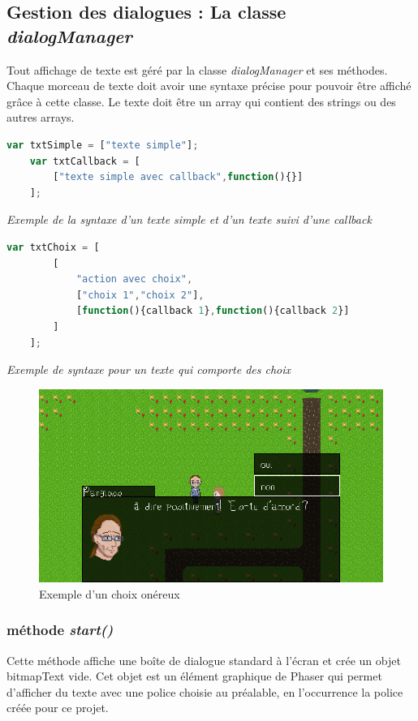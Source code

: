 \documentclass[11pt]{article}
\begin{document}
\subsection{Gestion des dialogues : La classe \textit{dialogManager}}
Tout affichage de texte est géré par la classe \textit{dialogManager} et ses méthodes. 
Chaque morceau de texte doit avoir une syntaxe précise pour pouvoir être affiché grâce à cette classe. Le texte doit être un array qui contient des strings ou des autres arrays.
\begin{lstlisting}[language=JavaScript]
	var txtSimple = ["texte simple"];
	var txtCallback = [
		["texte simple avec callback",function(){}]
	];
\end{lstlisting}
\textit{Exemple de la syntaxe d'un texte simple et d'un texte suivi d'une callback}\\
\begin{lstlisting}[language=JavaScript]
	var txtChoix = [
		[
			"action avec choix",
			["choix 1","choix 2"],
			[function(){callback 1},function(){callback 2}]
		]
	];
\end{lstlisting} 
\textit{Exemple de syntaxe pour un texte qui comporte des choix}
\begin{figure}[H]
\includegraphics[scale=0.33]{choix}
\centering
\caption{Exemple d'un choix onéreux}

\end{figure}
\subsubsection{méthode \textit{start()}}
Cette méthode affiche une boîte de dialogue standard à l'écran et crée un objet bitmapText vide. Cet objet est un élément graphique de Phaser qui permet d'afficher du texte avec une police choisie au préalable, en l'occurrence la police créée pour ce projet.
\end{document}

